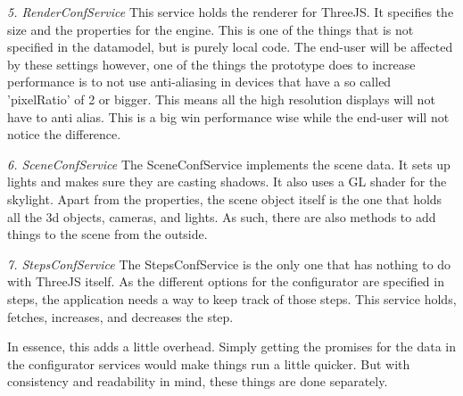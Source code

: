 \textit{5. RenderConfService} \newline
This service holds the renderer for ThreeJS. It specifies the size and the properties for the engine. This is one of the things that is not specified in the datamodel, but is purely local code. The end-user will be affected by these settings however, one of the things the prototype does to increase performance is to not use anti-aliasing in devices that have a so called 'pixelRatio' of 2 or bigger. This means all the high resolution displays will not have to anti alias. This is a big win performance wise while the end-user will not notice the difference.

\textit{6. SceneConfService} \newline
The SceneConfService implements the scene data. It sets up lights and makes sure they are casting shadows. It also uses a GL shader for the skylight. Apart from the properties, the scene object itself is the one that holds all the 3d objects, cameras, and lights. As such, there are also methods to add things to the scene from the outside.\newline

\textit{7. StepsConfService} \newline
The StepsConfService is the only one that has nothing to do with ThreeJS itself. As the different options for the configurator are specified in steps, the application needs a way to keep track of those steps. This service holds, fetches, increases, and decreases the step. 

In essence, this adds a little overhead. Simply getting the promises for the data in the configurator services would make things run a little quicker. But with consistency and readability in mind, these things are done separately.

\clearpage
